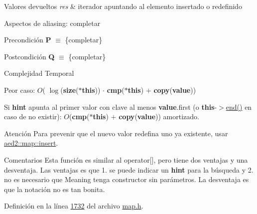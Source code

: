 \begin{DoxyRetVals}{Valores devueltos}
{\em res} & iterador apuntando al elemento insertado o redefinido\\
\hline
\end{DoxyRetVals}
\begin{DoxyParagraph}{Aspectos de aliasing\+:}
completar
\end{DoxyParagraph}
\begin{DoxyPrecond}{Precondición}
{\bfseries P} $\equiv$ \{completar\} 
\end{DoxyPrecond}
\begin{DoxyPostcond}{Postcondición}
{\bfseries Q} $\equiv$ \{completar\}
\end{DoxyPostcond}

\begin{DoxyDescription}
\item[Complejidad Temporal]
\begin{DoxyItemize}
\item Peor caso\+: $O$( $\log$({\bfseries size}({\bfseries $\ast$this})) $\cdot$ {\bfseries cmp}({\bfseries $\ast$this}) $+$ {\bfseries copy}({\bfseries value}))
\item Si {\bfseries hint} apunta al primer valor con clave al menos {\bfseries value}.first (o {\bfseries this}-\/$>$\hyperlink{classaed2_1_1map_a76023e6a56cb625513e1b5ea028bf983_a76023e6a56cb625513e1b5ea028bf983}{end()} en caso de no existir)\+: $O$({\bfseries cmp}({\bfseries $\ast$this}) $+$ {\bfseries copy}({\bfseries value})) amortizado. 
\end{DoxyItemize}
\end{DoxyDescription}

\begin{DoxyAttention}{Atención}
Para prevenir que el nuevo valor redefina uno ya existente, usar \hyperlink{classaed2_1_1map_a6941cde9a79c27f054b5c97a587a1854_a6941cde9a79c27f054b5c97a587a1854}{aed2\+::map\+::insert}. 
\end{DoxyAttention}
\begin{DoxyRemark}{Comentarios}
Esta función es similar al operator\mbox{[}\mbox{]}, pero tiene dos ventajas y una desventaja. Las ventajas es que 1. se puede indicar un {\bfseries hint} para la búsqueda y 2. no es necesario que Meaning tenga constructor sin parámetros. La desventaja es que la notación no es tan bonita. 
\end{DoxyRemark}


Definición en la línea \hyperlink{map_8h_source_l01732}{1732} del archivo \hyperlink{map_8h_source}{map.\+h}.

